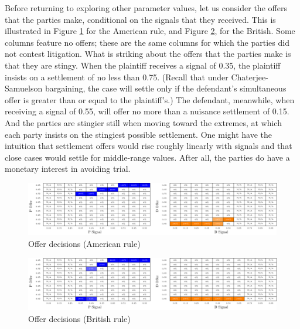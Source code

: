 \documentclass{article}
\begin{document}
Before returning to exploring other parameter values, let us consider the offers that the parties make, conditional on the signals that they received. This is illustrated in Figure \ref{fig:offers_american} for the American rule, and Figure \ref{fig:offers_british}, for the British. Some columns feature no offers; these are the same columns for which the parties did not contest litigation. What is striking about the offers that the parties make is that they are stingy. When the plaintiff receives a signal of 0.35, the plaintiff insists on a settlement of no less than 0.75. (Recall that under Chaterjee-Samuelson bargaining, the case will settle only if the defendant's simultaneous offer is greater than or equal to the plaintiff's.) The defendant, meanwhile, when receiving a signal of 0.55, will offer no more than a nuisance settlement of 0.15. And the parties are stingier still when moving toward the extremes, at which each party insists on the stingiest possible settlement. One might have the intuition that settlement offers would rise roughly linearly with signals and that close cases would settle for middle-range values. After all, the parties do have a monetary interest in avoiding trial. 

\begin{figure}[h!]
\centering
\includegraphics[scale=0.50, trim={0in 0in 0in 0in}, clip]{../Figures/Offers heatmap (American).pdf}
\caption{Offer decisions (American rule)}
\label{fig:offers_american}
\end{figure}

\begin{figure}[h!]
\centering
\includegraphics[scale=0.50, trim={0in 0in 0in 0in}, clip]{../Figures/Offers heatmap (British).pdf}
\caption{Offer decisions (British rule)}
\label{fig:offers_british}
\end{figure}
\end{document}
